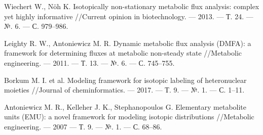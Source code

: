 \documentclass[a4paper, 12pt, left=30mm, right=15mm, top=20mm, bottom=20mm]{report}
\begin{document}
\begin{thebibliography}{XXXX}
	Wiechert W., Nöh K. Isotopically non-stationary metabolic flux analysis: complex yet highly informative //Current opinion in biotechnology. --- 2013. --- Т. 24. --- №. 6. --- С. 979--986.
	
	Leighty R. W., Antoniewicz M. R. Dynamic metabolic flux analysis (DMFA): a framework for determining fluxes at metabolic non-steady state //Metabolic engineering. --- 2011. --- Т. 13. --- №. 6. --- С. 745--755.

	
	Borkum M. I. et al. Modeling framework for isotopic labeling of heteronuclear moieties //Journal of cheminformatics. --- 2017. --- Т. 9. --- №. 1. --- С. 1--11.
	
	Antoniewicz M. R., Kelleher J. K., Stephanopoulos G. Elementary metabolite units (EMU): a novel framework for modeling isotopic distributions //Metabolic engineering. --- 2007 --- Т. 9. --- №. 1. --- С. 68--86.
	
\end{thebibliography}
\end{document}
